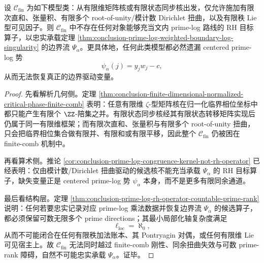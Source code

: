 \begin{theorem}\label{thm:conclusion-prime-log-finite-rank-congruence-twist-class-nogo}
设 \(\mathcal C_{\mathrm{fin}}\) 为如下模型类：从有限维矩阵核或有限状态同步核出发，仅允许施加有限次直和、张量积、有限多个 root-of-unity/模计数 Dirichlet 扭曲，以及有限秩 Lie 型可见因子。则 \(\mathcal C_{\mathrm{fin}}\) 中不存在任何对象能够充当文内 prime-log 路线的 RH 目标算子，以忠实承载定理 \ref{thm:conclusion-prime-log-weighted-boundary-log-singularity} 的边界流 \(\Psi_\alpha\)。更具体地，任何此类模型都必然遗漏 centered prime-log 势
\[
\psi_\alpha(j)=y_jw_j-c,
\]
从而无法恢复真正的边界驱动变量。
\end{theorem}
\begin{proof}
先看解析几何侧。定理 \ref{thm:conclusion-finite-dimensional-normalized-critical-phase-finite-comb} 表明：任意有限维 \(\zeta\)-型矩阵核在归一化临界相位坐标中都只能产生有限个 \(\ZZ\)-陪集之并。有限状态同步核经其有限状态转移矩阵实现后仍属于同一有限维框架；而有限次直和、张量积与有限多个 root-of-unity 扭曲，只会把临界相位集合做有限并、有限和或有限平移，因此整个 \(\mathcal C_{\mathrm{fin}}\) 仍被困在 finite-comb 机制中。

再看算术侧。推论 \ref{cor:conclusion-prime-log-congruence-kernel-not-rh-operator} 已经表明：仅由模计数/Dirichlet 扭曲驱动的候选核不能充当承载 \(\Psi_\alpha\) 的 RH 目标算子，缺失变量正是 centered prime-log 势 \(\psi_\alpha\) 本身，而不是更多有限同余通道。

最后看结构层。定理 \ref{thm:conclusion-prime-log-rh-operator-countable-prime-rank} 说明：任何若要忠实记录对应 prime-log 乘法数据并恢复边界流 \(\Psi_\alpha\) 的候选算子，都必须保留可数无限多个 prime directions；其最小局部化轴复杂度满足
\[
\ell_{\mathrm{loc}}=\aleph_0,
\]
从而不可能闭合在任何有限秩加法账本、其 Pontryagin 对偶，或任何有限维 Lie 可见宿主上。故 \(\mathcal C_{\mathrm{fin}}\) 无法同时越过 finite-comb 刚性、同余扭曲失效与可数 prime-rank 障碍，自然不可能忠实承载 \(\Psi_\alpha\)。证毕。
\end{proof}

